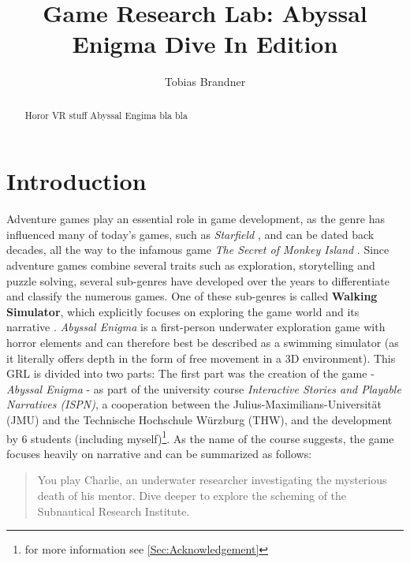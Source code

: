 \documentclass[letterpaper, 10 pt, conference]{ieeeconf}  %
\title{\LARGE \bf
Game Research Lab: Abyssal Enigma Dive In Edition
}
\author{Tobias Brandner}
\affil{Julius-Maximilians University \\
        Würzburg, Germany \\
        tobias.brandner@stud-mail.uni-wuerzburg.de}
\begin{document}
\maketitle
\thispagestyle{empty}
\pagestyle{empty}

\BiblatexSplitbibDefernumbersWarningOff

\begin{abstract}

    Horor VR stuff Abyssal Engima bla bla
    
\end{abstract}


\section{Introduction}

Adventure games play an essential role in game development, 
as the genre has influenced many of today's games, such as \textit{Starfield} \cite{starfield},
and can be dated back decades, all the way to the infamous game \textit{The Secret of Monkey Island} \cite{monkey}.
Since adventure games combine several traits such as exploration, storytelling and puzzle solving, several sub-genres have developed over the years to differentiate and classify the numerous games.
One of these sub-genres is called \textbf{Walking Simulator}, which explicitly focuses on exploring the game world and its narrative \cite{adventure}.
\textit{Abyssal Enigma} is a first-person underwater exploration game with horror elements and can therefore best be described as a swimming simulator 
(as it literally offers depth in the form of free movement in a 3D environment).
This GRL is divided into two parts:
The first part was the creation of the game - \textit{Abyssal Enigma} - as part of the university course \textit{Interactive Stories and Playable Narratives (ISPN)}, 
a cooperation between the Julius-Maximilians-Universität (JMU) and the Technische Hochschule Würzburg (THW),
and the development by 6 students (including myself)\footnote{for more information see \ref{Sec:Acknowledgement}}. 
As the name of the course suggests, the game focuses heavily on narrative and can be summarized as follows:

\begin{quote}
    You play Charlie, an underwater researcher investigating the mysterious death of his mentor.
    Dive deeper to explore the scheming of the Subnautical Research Institute.
\end{quote} 
\end{document}
